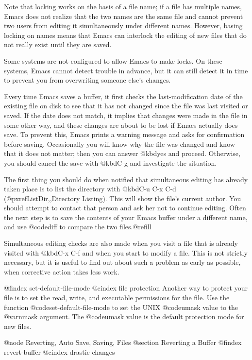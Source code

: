{{{{{{{{{{{{{{{{{  Note that locking works on the basis of a file name; if a file has
multiple names, Emacs does not realize that the two names are the same file
and cannot prevent two users from editing it simultaneously under different
names.  However, basing locking on names means that Emacs can interlock the
editing of new files that do not really exist until they are saved.

  Some systems are not configured to allow Emacs to make locks.  On
these systems, Emacs cannot detect trouble in advance, but it can still
detect it in time to prevent you from overwriting someone else's changes.

  Every time Emacs saves a buffer, it first checks the last-modification
date of the existing file on disk to see that it has not changed since the
file was last visited or saved.  If the date does not match, it implies
that changes were made in the file in some other way, and these changes are
about to be lost if Emacs actually does save.  To prevent this, Emacs
prints a warning message and asks for confirmation before saving.
Occasionally you will know why the file was changed and know that it does
not matter; then you can answer @kbd{yes} and proceed.  Otherwise, you should
cancel the save with @kbd{C-g} and investigate the situation.

  The first thing you should do when notified that simultaneous editing
has already taken place is to list the directory with @kbd{C-u C-x C-d}
(@pxref{ListDir,,Directory Listing}).  This will show the file's current
author.  You should attempt to contact that person and ask her not to
continue editing.  Often the next step is to save the contents of your
Emacs buffer under a different name, and use @code{diff} to compare the
two files.@refill

  Simultaneous editing checks are also made when you visit a file that
is already visited with @kbd{C-x C-f} and when you start to modify a
file.  This is not strictly necessary, but it is useful to find out
about such a problem as early as possible, when corrective action takes
less work.

@findex set-default-file-mode
@cindex file protection
Another way to protect your file is to set the read, write, and
executable permissions for the file. Use the function
@code{set-default-file-mode} to set the UNIX @code{umask} value to the
@var{nmask} argument. The @code{umask} value is the default protection
mode for new files.

@node Reverting, Auto Save, Saving, Files
@section Reverting a Buffer
@findex revert-buffer
@cindex drastic changes

}}}}}}}}}}}}}}}}}
